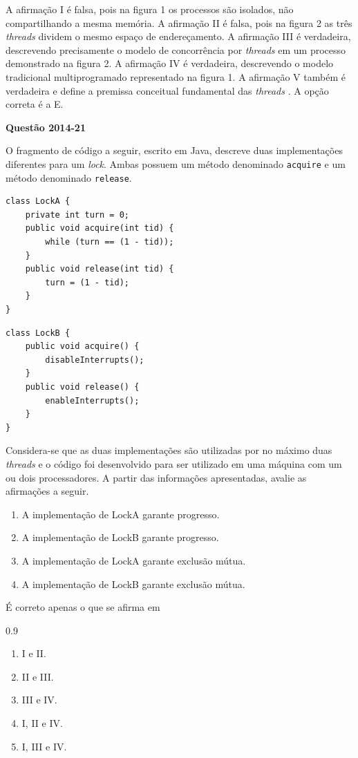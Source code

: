 \documentclass[12pt,a4paper]{article}
\newenvironment{Question}[1]{%
    \pdfbookmark[3]{Questão #1}{q:#1}
    \label{q:#1}
    \par\bigskip\noindent
    \textbf{Questão #1} \dotfill
    \par\noindent
    \nopagebreak
    \ignorespaces
}{%
    \noindent\dotfill
}
\newenvironment{QuestionOptions}{%
    \begin{spacing}{0.9}%
    \small
    \begin{enumerate}[label=\Alph*)]
}{%
    \end{enumerate}
    \end{spacing}
}
\newenvironment{QuestionPage}[1][\linewidth]{%
    \medskip\noindent
    \begin{minipage}[t]{#1}
}{%
    \end{minipage}
    \medskip
}
\begin{document}
A afirmação I é falsa, pois na figura 1 os processos são isolados, não compartilhando a mesma memória.
A afirmação II é falsa, pois na figura 2 as três \textit{threads} dividem o mesmo espaço de endereçamento.
A afirmação III é verdadeira, descrevendo precisamente o modelo de concorrência por \textit{threads} em um processo demonstrado na figura 2.
A afirmação IV é verdadeira, descrevendo o modelo tradicional multiprogramado representado na figura 1.
A afirmação V também é verdadeira e define a premissa conceitual fundamental das \textit{threads} \parencite[seç.~2.2]{tanenbaum2016}.
A opção correta é a E.

\begin{Question}{2014-21}
O fragmento de código a seguir, escrito em Java, descreve duas implementações diferentes para um \textit{lock}.
Ambas possuem um método denominado \texttt{acquire} e um método denominado \texttt{release}.

\begin{QuestionPage}[0.4\linewidth]
\begin{Verbatim}
class LockA {
    private int turn = 0;
    public void acquire(int tid) {
        while (turn == (1 - tid));
    }
    public void release(int tid) {
        turn = (1 - tid);
    }
}
\end{Verbatim}
\end{QuestionPage}
\hfill
\begin{QuestionPage}[0.4\linewidth]
\begin{Verbatim}
class LockB {
    public void acquire() {
        disableInterrupts();
    }
    public void release() {
        enableInterrupts();
    }
}
\end{Verbatim}
\end{QuestionPage}

\noindent
[Adaptado:] Considera-se que as duas implementações são utilizadas por no máximo duas \textit{threads} e o código foi desenvolvido
para ser utilizado em uma máquina com um ou dois processadores.
A partir das informações apresentadas, avalie as afirmações a seguir.
\begin{enumerate}[label=\Roman*.]
    \item A implementação de LockA garante progresso.
    \item A implementação de LockB garante progresso.
    \item A implementação de LockA garante exclusão mútua.
    \item A implementação de LockB garante exclusão mútua.
\end{enumerate}
É correto apenas o que se afirma em
\begin{QuestionOptions}
    \item I e II.
    \item II e III.
    \item III e IV.
    \item I, II e IV.
    \item I, III e IV.
\end{QuestionOptions}
\end{Question}
\end{document}
